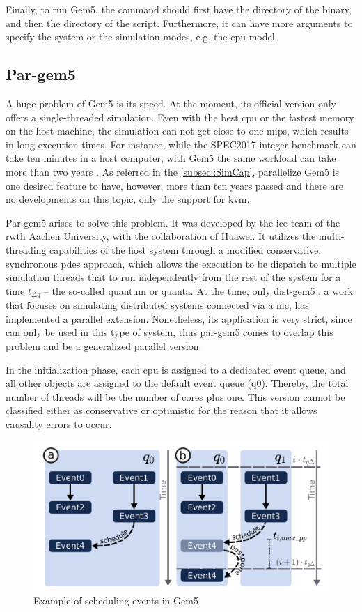 Finally, to run Gem5, the command should first have the directory of the binary, and then the directory of the script. Furthermore, it can have more arguments to specify the system or the simulation modes, e.g. the \gls{cpu} model.

\subsection{Par-gem5}
\label{subsec:pargem5}

A huge problem of Gem5 is its speed. At the moment, its official version only offers a single-threaded simulation. Even with the best \gls{cpu} or the fastest memory on the host machine, the simulation can not get close to one \gls{mips}, which results in long execution times. For instance, while the SPEC2017 integer benchmark can take ten minutes in a host computer, with Gem5 the same workload can take more than two years \cite{pargem5}. As referred in the \autoref{subsec::SimCap}, parallelize Gem5 is one desired feature to have, however, more than ten years passed and there are no developments on this topic, only the support for \gls{kvm}. 

Par-gem5 \cite{pargem5} arises to solve this problem. It was developed by the \gls{ice} team of the \gls{rwth} Aachen University, with the collaboration of Huawei. It utilizes the multi-threading capabilities of the host system through a modified conservative, synchronous \gls{pdes} approach, which allows the execution to be dispatch to multiple simulation threads that to run independently from the rest of the system for a time $t_{\Delta q}$ – the so-called quantum or quanta. At the time, only dist-gem5 \cite{dist-gem5}, a work that focuses on simulating distributed systems connected via a \gls{nic}, has implemented a parallel extension. Nonetheless, its application is very strict, since can only be used in this type of system, thus par-gem5 comes to overlap this problem and be a generalized parallel version.

In the initialization phase, each \gls{cpu} is assigned to a dedicated event queue, and all other objects are assigned to the default event queue (q0). Thereby, the total number of threads will be the number of cores plus one. This version cannot be classified either as conservative or optimistic for the reason that it allows causality errors to occur.

\begin{figure}[H]
	\centering
 	\includegraphics[width=0.7\linewidth]{Images/SchedulingEventGem5.png}
 	\caption{Example of scheduling events in Gem5 \cite{pargem5}}
	 \label{fig_SchedulingEventGem5}
\end{figure}

